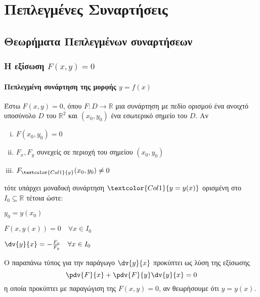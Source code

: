     \chapter{Πεπλεγμένες Συναρτήσεις}


    \section{Θεωρήματα Πεπλεγμένων συναρτήσεων}

    \vspace{\baselineskip}

    \subsection{Η εξίσωση \ensuremath{F(x,y) = 0}}

    \subsubsection{Πεπλεγμένη συνάρτηση της μορφής \ensuremath{y=f(x)}}

    Έστω $ F(x,y) = 0 $, όπου $ F\colon D \to \mathbb{R} $ μια συνάρτηση με πεδίο
    ορισμού ένα ανοιχτό υποσύνολο $D$ του $\mathbb{R}^{2}$ και $ (x_0,y_0) $ ένα 
    εσωτερικό σημείο του $D$.  Αν 
    \begin{enumerate}[(i)]
      \item $F(x_0,y_0) = 0$ 
      \item $ F_x, F_y$ συνεχείς σε περιοχή του σημείου $ (x_0,y_0) $ 
      \item $ F_{\textcolor{Col1}{y}}(x_0,y_0) \neq 0 $
    \end{enumerate}
    τότε υπάρχει μοναδική συνάρτηση $\textcolor{Col1}{y=y(x)} $ ορισμένη στο $ I_0 \subseteq \mathbb{R} $ 
    τέτοια ώστε:
    \begin{myitemize}
      \item $y_0 = y(x_0)$
      \item $F(x,y(x)) = 0 \quad \forall x \in I_0$
      \item $ \dv{y}{x} = - \frac{F_x}{F_y} \quad \forall x \in I_0  $
    \end{myitemize}

    \begin{rem}
      Ο παραπάνω τύπος για την παράγωγο $ \dv{y}{x} $ προκύπτει ως λύση της εξίσωσης
      \[
        \pdv{F}{x} + \pdv{F}{y}\dv{y}{x} = 0 
      \] 
      η οποία προκύπτει με παραγώγιση της $ F(x,y) = 0$, αν θεωρήσουμε ότι $ y=y(x) $.
    \end{rem}

